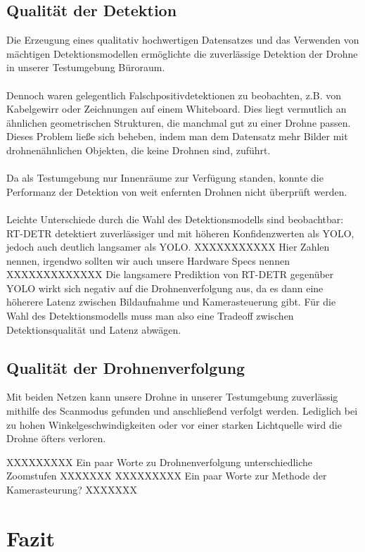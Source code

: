 \documentclass[runningheads]{llncs}
\begin{document}
\subsection{Qualität der Detektion}
Die Erzeugung eines qualitativ hochwertigen Datensatzes und das Verwenden von mächtigen Detektionsmodellen ermöglichte die zuverlässige Detektion der Drohne in unserer Testumgebung Büroraum.\\\\
Dennoch waren gelegentlich Falschpositivdetektionen zu beobachten, z.B. von Kabelgewirr oder Zeichnungen auf einem Whiteboard. Dies liegt vermutlich an ähnlichen geometrischen Strukturen, die manchmal gut zu einer Drohne passen. Dieses Problem ließe sich beheben, indem man dem Datensatz mehr Bilder mit drohnenähnlichen Objekten, die keine Drohnen sind, zuführt.\\\\
Da als Testumgebung nur Innenräume zur Verfügung standen, konnte die Performanz der Detektion von weit enfernten Drohnen nicht überprüft werden.\\\\
Leichte Unterschiede durch die Wahl des Detektionsmodells sind beobachtbar: RT-DETR detektiert zuverlässiger und mit höheren Konfidenzwerten als YOLO, jedoch auch deutlich langsamer als YOLO. XXXXXXXXXXX Hier Zahlen nennen, irgendwo sollten wir auch unsere Hardware Specs nennen XXXXXXXXXXXXX
Die langsamere Prediktion von RT-DETR gegenüber YOLO wirkt sich negativ auf die Drohnenverfolgung aus, da es dann eine höherere Latenz zwischen Bildaufnahme und Kamerasteuerung gibt.
Für die Wahl des Detektionsmodells muss man also eine Tradeoff zwischen Detektionsqualität und Latenz abwägen.
\subsection{Qualität der Drohnenverfolgung}
Mit beiden Netzen kann unsere Drohne in unserer Testumgebung zuverlässig mithilfe des Scanmodus gefunden und anschließend verfolgt werden.
Lediglich bei zu hohen Winkelgeschwindigkeiten oder vor einer starken Lichtquelle wird die Drohne öfters verloren.

XXXXXXXXX Ein paar Worte zu Drohnenverfolgung unterschiedliche Zoomstufen XXXXXXX
XXXXXXXXX Ein paar Worte zur Methode der Kamerasteurung? XXXXXXX
\section{Fazit}
\end{document}
